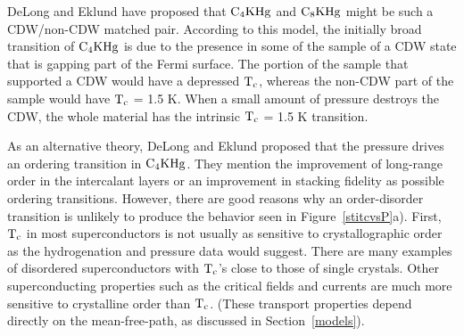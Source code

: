        DeLong and Eklund have proposed that $\rm C_4KHg$  and $\rm C_8KHg$
might be such a CDW/non-CDW matched pair.\cite{delong83} According to this model, the
initially broad transition of $\rm C_4KHg$ is due to the  presence  in some
of the sample  of a  CDW state that is gapping  part  of the Fermi surface.
The portion of the sample that supported a CDW would have  a depressed $\rm
T_c$, whereas the non-CDW part of the sample would have $\rm  T_c$ = 1.5 K.
When a small amount of pressure destroys  the CDW,  the  whole material has
the intrinsic $\rm T_c$ = 1.5 K transition.

        As an alternative theory, DeLong  and Eklund\cite{delong83} proposed
that the  pressure drives  an ordering  transition in $\rm   C_4KHg$.  They
mention the improvement of long-range order in the intercalant layers or an
improvement  in    stacking fidelity as   possible    ordering transitions.
However,  there  are  good  reasons  why   an order-disorder  transition is
unlikely  to produce the  behavior seen in Figure~\ref{stitcvsP}a).  First,
$\rm T_c$   in  most  superconductors   is not  usually as    sensitive  to
crystallographic  order   as the  hydrogenation  and  pressure   data would
suggest.  There  are many examples of  disordered superconductors with $\rm
T_c$'s close to those of single crystals.  Other superconducting properties
such  as   the  critical fields and   currents are much   more sensitive to
crystalline  order  than  $\rm T_c$.   (These  transport  properties   depend
directly on the mean-free-path, as discussed in Section~\ref{models}).

